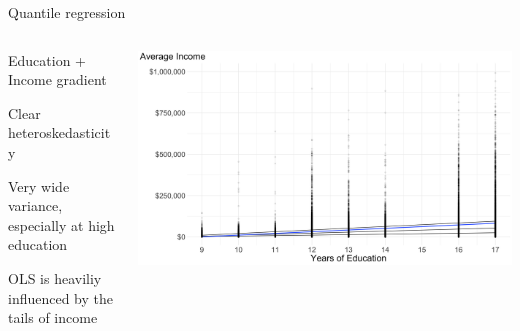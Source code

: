 \documentclass[notes,11pt, aspectratio=169]{beamer}
\newenvironment{wideitemize}{\itemize\addtolength{\itemsep}{10pt}}{\enditemize}
\begin{document}
\begin{frame}{Quantile regression}
  \begin{columns}[T] %
    \begin{column}{.3\textwidth}
  \begin{wideitemize}
    \item Education + Income  gradient
    \item Clear heteroskedasticity
    \item Very wide variance, especially at high education
    \item OLS is heaviliy influenced by the tails of income
  \end{wideitemize}
  \end{column}%
  \hfill%
  \begin{column}{.7\textwidth}
    \includegraphics[width=\linewidth]{avg_income_education_scatter_ols_quantile.png}
  \end{column}
\end{columns}
\end{frame}
\end{document}
